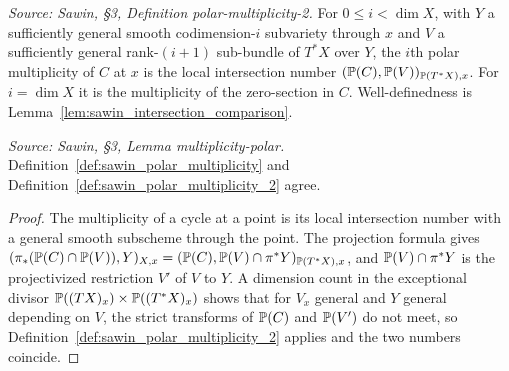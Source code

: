\begin{definition}
  \label{def:sawin_polar_multiplicity_2}
  \textit{Source: Sawin, §3, Definition polar-multiplicity-2.}
  For $0\le i<\dim X$, with $Y$ a sufficiently general smooth codimension-$i$
  subvariety through $x$ and $V$ a sufficiently general rank-$(i+1)$ sub-bundle of
  $T^*X$ over $Y$, the $i$th polar multiplicity of $C$ at $x$ is the local
  intersection number $(\mathbb{P}(C),\mathbb{P}(V))_{\mathbb{P}(T^*X),x}$.  For $i=\dim X$ it is the
  multiplicity of the zero-section in $C$.  Well-definedness is
  Lemma~\ref{lem:sawin_intersection_comparison}.
\end{definition}

\begin{lemma}
  \label{lem:sawin_multiplicity_polar}
  \textit{Source: Sawin, §3, Lemma multiplicity-polar.}
  Definition~\ref{def:sawin_polar_multiplicity} and
  Definition~\ref{def:sawin_polar_multiplicity_2} agree.
\end{lemma}
\begin{proof}
  The multiplicity of a cycle at a point is its local intersection number with a
  general smooth subscheme through the point.  The projection formula gives
  $(\pi_*(\mathbb{P}(C)\cap\mathbb{P}(V)),Y)_{X,x} = (\mathbb{P}(C),\mathbb{P}(V)\cap\pi^*Y)_{\mathbb{P}(T^*X),x}$,
  and $\mathbb{P}(V)\cap\pi^*Y$ is the projectivized restriction $V'$ of $V$ to $Y$.  A
  dimension count in the exceptional divisor $\mathbb{P}((TX)_x)\times\mathbb{P}((T^*X)_x)$
  shows that for $V_x$ general and $Y$ general depending on $V$, the strict
  transforms of $\mathbb{P}(C)$ and $\mathbb{P}(V')$ do not meet, so
  Definition~\ref{def:sawin_polar_multiplicity_2} applies and the two numbers
  coincide.
\end{proof}

